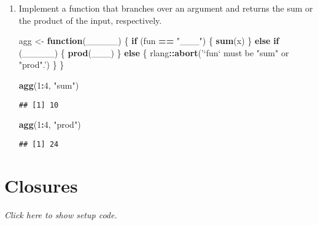\documentclass[]{book}
\newenvironment{Shaded}{\begin{snugshade}}{\end{snugshade}}
\newcommand{\ControlFlowTok}[1]{\textcolor[rgb]{0.13,0.29,0.53}{\textbf{#1}}}
\newcommand{\DecValTok}[1]{\textcolor[rgb]{0.00,0.00,0.81}{#1}}
\newcommand{\KeywordTok}[1]{\textcolor[rgb]{0.13,0.29,0.53}{\textbf{#1}}}
\newcommand{\NormalTok}[1]{#1}
\newcommand{\OperatorTok}[1]{\textcolor[rgb]{0.81,0.36,0.00}{\textbf{#1}}}
\newcommand{\StringTok}[1]{\textcolor[rgb]{0.31,0.60,0.02}{#1}}
\begin{document}
\begin{enumerate}
\def\labelenumi{\arabic{enumi}.}
\item
  Implement a function that branches over an argument and returns the sum or the product of the input, respectively.

\begin{Shaded}
\begin{Highlighting}[]
\NormalTok{agg <-}\StringTok{ }\ControlFlowTok{function}\NormalTok{(_____) \{}
  \ControlFlowTok{if}\NormalTok{ (fun }\OperatorTok{==}\StringTok{ "___"}\NormalTok{) \{}
    \KeywordTok{sum}\NormalTok{(x)}
\NormalTok{  \} }\ControlFlowTok{else} \ControlFlowTok{if}\NormalTok{ (_____) \{}
    \KeywordTok{prod}\NormalTok{(___)}
\NormalTok{  \} }\ControlFlowTok{else}\NormalTok{ \{}
\NormalTok{    rlang}\OperatorTok{::}\KeywordTok{abort}\NormalTok{(}\StringTok{'`fun` must be "sum" or "prod".'}\NormalTok{)}
\NormalTok{  \}}
\NormalTok{\}}
\end{Highlighting}
\end{Shaded}

\begin{Shaded}
\begin{Highlighting}[]
\KeywordTok{agg}\NormalTok{(}\DecValTok{1}\OperatorTok{:}\DecValTok{4}\NormalTok{, }\StringTok{"sum"}\NormalTok{)}
\end{Highlighting}
\end{Shaded}

\begin{verbatim}
## [1] 10
\end{verbatim}

\begin{Shaded}
\begin{Highlighting}[]
\KeywordTok{agg}\NormalTok{(}\DecValTok{1}\OperatorTok{:}\DecValTok{4}\NormalTok{, }\StringTok{"prod"}\NormalTok{)}
\end{Highlighting}
\end{Shaded}

\begin{verbatim}
## [1] 24
\end{verbatim}
\end{enumerate}

\hypertarget{closures}{%
\section{Closures}\label{closures}}

\emph{Click here to show setup code.}
\end{document}

